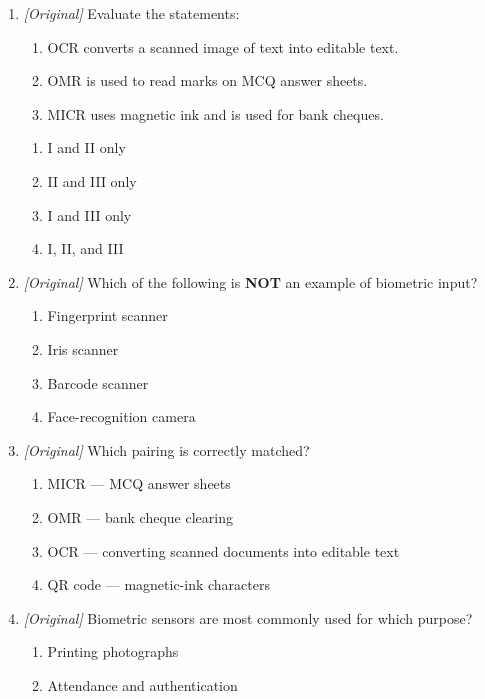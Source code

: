 \documentclass[11pt]{article}
\begin{document}
\begin{enumerate}[label=\textbf{Q\arabic*.}, leftmargin=*]
\begin{enumerate}[label=\Alph*.]
    \item QR code
    \item RFID
    \item OCR of a printed page
  \end{enumerate}
\item \textit{[Original]} Evaluate the statements:
  \begin{enumerate}[label=\Roman*.]
    \item OCR converts a scanned image of text into editable text.
    \item OMR is used to read marks on MCQ answer sheets.
    \item MICR uses magnetic ink and is used for bank cheques.
  \end{enumerate}
  \begin{enumerate}[label=\Alph*.]
    \item I and II only
    \item II and III only
    \item I and III only
    \item I, II, and III
  \end{enumerate}
\item \textit{[Original]} Which of the following is \textbf{NOT} an example
  of biometric input?
  \begin{enumerate}[label=\Alph*.]
    \item Fingerprint scanner
    \item Iris scanner
    \item Barcode scanner
    \item Face-recognition camera
  \end{enumerate}
\item \textit{[Original]} Which pairing is correctly matched?
  \begin{enumerate}[label=\Alph*.]
    \item MICR --- MCQ answer sheets
    \item OMR --- bank cheque clearing
    \item OCR --- converting scanned documents into editable text
    \item QR code --- magnetic-ink characters
  \end{enumerate}
\item \textit{[Original]} Biometric sensors are most commonly used for which
  purpose?
  \begin{enumerate}[label=\Alph*.]
    \item Printing photographs
    \item Attendance and authentication

\end{enumerate}
\end{enumerate}
\end{document}

